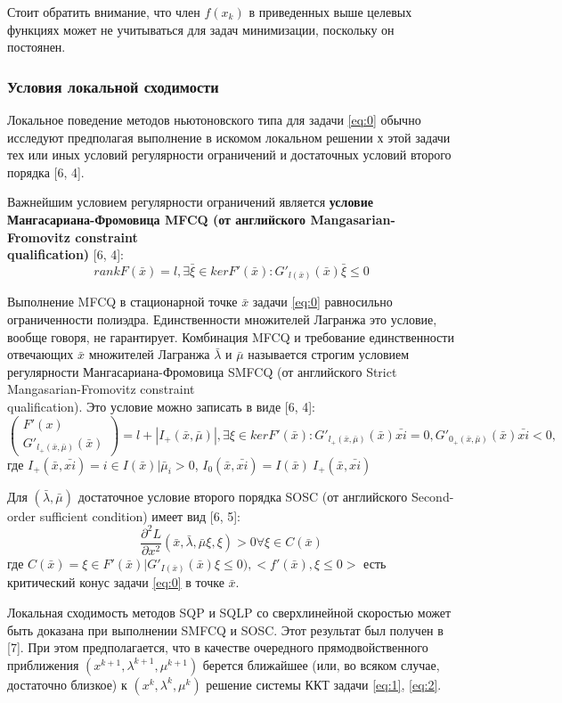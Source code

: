 \documentclass[12pt,a4paper]{article}
\begin{document}
	Стоит обратить внимание, что член $f(x_{k})$ в приведенных выше целевых функциях может не учитываться для задач минимизации, поскольку он постоянен.
	
	\subsubsection{Условия локальной сходимости}
	Локальное поведение методов ньютоновского типа для задачи \ref{eq:0} обычно исследуют предполагая выполнение в искомом локальном решении $х$ этой задачи тех или иных условий регулярности ограничений и достаточных условий второго порядка [6, 4].
	
	Важнейшим условием регулярности ограничений является \textbf{условие Мангасариана-Фромовица MFCQ (от английского Mangasarian-Fromovitz constraint\\qualification)} [6, 4]:
	$$
	rank F(\bar{x}) = l, \exists\bar\xi \in kerF'(\bar{x}) : G'_{l(\bar{x})}(\bar{x})\bar{\xi} \leq 0 
	$$
	
	Выполнение MFCQ в стационарной точке $\bar{x}$ задачи \ref{eq:0} равносильно ограниченности полиэдра. Единственности множителей Лагранжа это условие, вообще говоря, не гарантирует. Комбинация MFCQ и требование единственности отвечающих $\bar{x}$ множителей Лагранжа $\bar{\lambda}$ и $\bar{\mu}$ называется строгим условием регулярности Мангасариана-Фромовица SMFCQ (от английского Strict Mangasarian-Fromovitz constraint\\qualification). Это условие можно записать в виде [6, 4]:
	\begin{equation}
		\begin{pmatrix}
			F'(x)\\
			G'_{l_{+}(\bar{x}, \bar{\mu})}(\bar{x})
		\end{pmatrix} = l + |I_{+}(\bar{x}, \bar{\mu})|,
		\exists \xi \in kerF'(\bar{x}): 	G'_{l_{+}(\bar{x}, \bar{\mu})}(\bar{x})\bar{xi} = 0, 	G'_{0_{+}(\bar{x}, \bar{\mu})}(\bar{x})\bar{xi} < 0,
	\end{equation}
	где 
	$I_+(\bar{x},\bar{xi}) = {i \in I(\bar{x})|\bar{\mu}_i > 0}$, 
	$ I_0(\bar{x},\bar{xi}) = I(\bar{x}) \ I_+(\bar{x},\bar{xi})$	
	
	Для $(\bar{\lambda}, \bar{\mu})$ достаточное условие второго порядка SOSC (от английского Second-order sufficient condition) имеет вид [6, 5]:
	\begin{equation}
		\frac{\partial^2 L}{\partial x^2}(\bar{x}, \bar{\lambda}, \bar{\mu}\xi, \xi) > 0 \forall\xi \in C(\bar{x})	
	\end{equation}	 
	где $C(\bar{x}) = {\xi \in F'(\bar{x})|G'_{I(\bar{x})}(\bar{x})\xi \leq 0)}, <f'(\bar{x}), \xi\leq 0>$ есть критический конус задачи \ref{eq:0} в точке $\bar{x}$.
	
	Локальная сходимость методов SQP и SQLP со сверхлинейной скоростью может быть доказана при выполнении SMFCQ и SOSC. Этот результат был получен в [7]. При этом предполагается, что в качестве очередного прямодвойственного приближения $(x^{k+1},\lambda^{k+1}, \mu^{k+1})$ берется ближайшее (или, во всяком случае, достаточно
	близкое) к $(x^{k},\lambda^{k}, \mu^{k})$ решение системы ККТ задачи \ref{eq:1}, \ref{eq:2}.	
\end{document}
